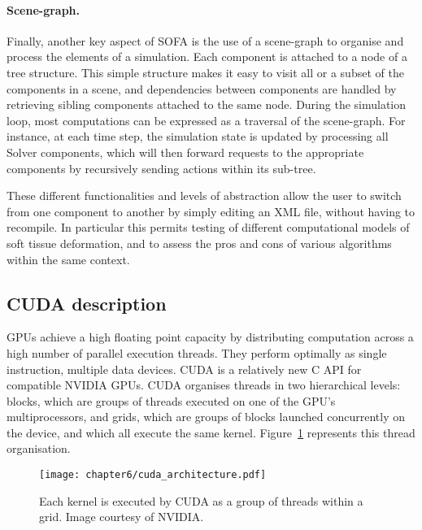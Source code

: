 \paragraph{Scene-graph.}
Finally, another key aspect of SOFA is the use of a scene-graph to organise and process the elements of a simulation. Each component is attached to a node of a tree structure. This simple structure makes it easy to visit all or a subset of the components in a scene, and dependencies between components are handled by retrieving sibling components attached to the same node. 
During the simulation loop, most computations can be expressed as a traversal of the scene-graph. For instance, at each time step, the simulation state is updated by processing all Solver components, which will then forward requests to the appropriate components by recursively sending actions within its sub-tree.

These different functionalities and levels of abstraction allow the user to switch from one component to another by simply editing an XML file, without having to recompile. In particular this permits testing of different computational models of soft tissue deformation, and to assess the pros and cons of various algorithms within the same context.


	
	\subsection{CUDA description}
GPUs achieve a high floating point capacity by distributing computation across a high number of parallel execution threads. They perform optimally as single instruction, multiple data devices. CUDA is a relatively new C API for compatible NVIDIA GPUs. CUDA organises threads in two hierarchical levels: blocks, which are groups of threads executed on one of the GPU's multiprocessors, and grids, which are groups of blocks launched concurrently on the device, and which all execute the same kernel. Figure~\ref{chap6:fig-cuda} represents this thread organisation. 

\begin{figure}[ht]
\begin{center}
\texttt{[image: chapter6/cuda\_architecture.pdf]} 
\caption[CUDA architecture] {Each kernel is executed by CUDA as a group of threads within a grid. Image courtesy of NVIDIA. }
\label{chap6:fig-cuda}
\end{center}
\end{figure}           

